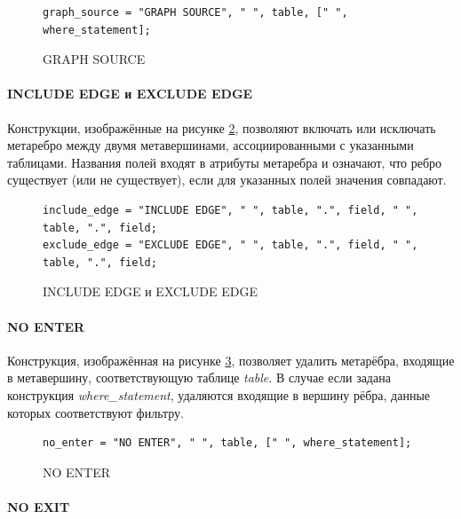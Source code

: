 \begin{figure}
  \begin{lstlisting}
graph_source = "GRAPH SOURCE", " ", table, [" ", where_statement];
  \end{lstlisting}
  \caption{GRAPH SOURCE}
  \label{symbol-graph-source}
\end{figure}

\paragraph{INCLUDE EDGE и EXCLUDE EDGE}

Конструкции, изображённые на рисунке \ref{symbol-include-exclude-edge}, позволяют включать или исключать метаребро между двумя метавершинами, ассоциированными с указанными таблицами. Названия полей входят в атрибуты метаребра и означают, что ребро существует (или не существует), если для указанных полей значения совпадают.

\begin{figure}
  \begin{lstlisting}
include_edge = "INCLUDE EDGE", " ", table, ".", field, " ", table, ".", field;
exclude_edge = "EXCLUDE EDGE", " ", table, ".", field, " ", table, ".", field;
  \end{lstlisting}
  \caption{INCLUDE EDGE и EXCLUDE EDGE}
  \label{symbol-include-exclude-edge}
\end{figure}

\paragraph{NO ENTER}

Конструкция, изображённая на рисунке \ref{symbol-no-enter}, позволяет удалить метарёбра, входящие в метавершину, соответствующую таблице \textit{table}. В случае если задана конструкция \textit{where\_statement}, удаляются входящие в вершину рёбра, данные которых соответствуют фильтру.

\begin{figure}
  \begin{lstlisting}
no_enter = "NO ENTER", " ", table, [" ", where_statement];
  \end{lstlisting}
  \caption{NO ENTER}
  \label{symbol-no-enter}
\end{figure}

\paragraph{NO EXIT}

